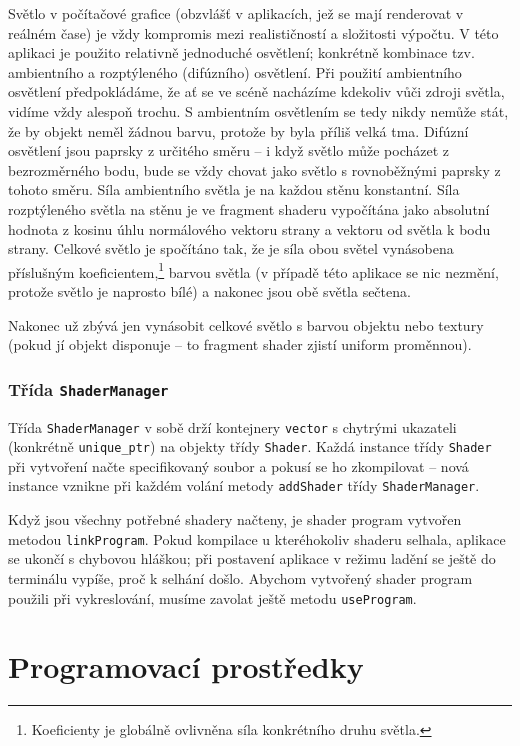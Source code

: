 \documentclass[a4paper, 11pt]{report}
\begin{document}
Světlo v počítačové grafice (obzvlášť v aplikacích, jež se mají renderovat v reálném čase) je vždy kompromis mezi realističností a složitosti výpočtu. V této aplikaci je použito relativně jednoduché osvětlení; konkrétně kombinace tzv. ambientního a rozptýleného (difúzního) osvětlení. Při použití ambientního osvětlení předpokládáme, že ať se ve scéně nacházíme kdekoliv vůči zdroji světla, vidíme vždy alespoň trochu. S ambientním osvětlením se tedy nikdy nemůže stát, že by objekt neměl žádnou barvu, protože by byla příliš velká tma. Difúzní osvětlení jsou paprsky z určitého směru -- i když světlo může pocházet z bezrozměrného bodu, bude se vždy chovat jako světlo s rovnoběžnými paprsky z tohoto směru. Síla ambientního světla je na každou stěnu konstantní. Síla rozptýleného světla na stěnu je ve fragment shaderu vypočítána jako absolutní hodnota z kosinu úhlu normálového vektoru strany a vektoru od světla k bodu strany. Celkové světlo je spočítáno tak, že je síla obou světel vynásobena příslušným koeficientem,\footnote{Koeficienty je globálně ovlivněna síla konkrétního druhu světla.} barvou světla (v případě této aplikace se nic nezmění, protože světlo je naprosto bílé) a nakonec jsou obě světla sečtena.

Nakonec už zbývá jen vynásobit celkové světlo s barvou objektu nebo textury (pokud jí objekt disponuje -- to fragment shader zjistí uniform proměnnou).

\subsection{Třída \texttt{ShaderManager}}
Třída \texttt{ShaderManager} v sobě drží kontejnery \texttt{vector} s chytrými ukazateli (konkrétně \texttt{unique\_ptr}) na objekty třídy \texttt{Shader}. Každá instance třídy \texttt{Shader} při vytvoření načte specifikovaný soubor a pokusí se ho zkompilovat -- nová instance vznikne při každém volání metody \texttt{addShader} třídy \texttt{ShaderManager}.

Když jsou všechny potřebné shadery načteny, je shader program vytvořen metodou \texttt{linkProgram}. Pokud kompilace u kteréhokoliv shaderu selhala, aplikace se ukončí s chybovou hláškou; při postavení aplikace v režimu ladění se ještě do terminálu vypíše, proč k selhání došlo. Abychom vytvořený shader program použili při vykreslování, musíme zavolat ještě metodu \texttt{useProgram}.

\chapter{Programovací prostředky}
\end{document}
